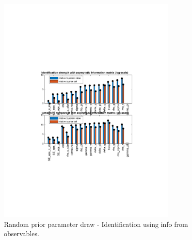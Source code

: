 
\begin{figure}[H]
\centering 
\includegraphics[width=0.8\textwidth]{monetary/identification/monetary_ident_strength_Random_prior_params}
\caption{Random prior parameter draw  - Identification using info from observables.}\label{Fig:ident:Random_prior_params}
\end{figure}

